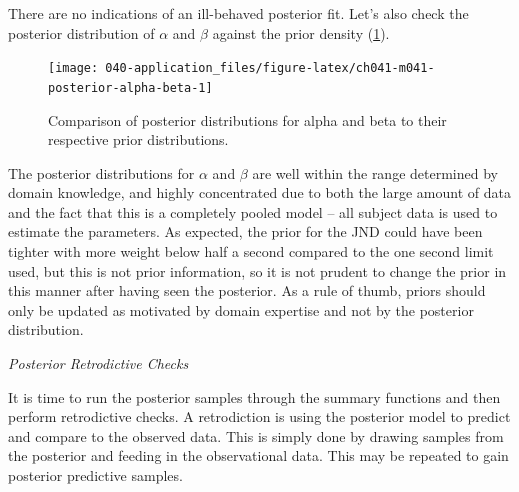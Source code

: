 \documentclass[11pt, oneside, openany]{scrbook}
\newenvironment{Shaded}{\begin{snugshade}}{\end{snugshade}}
\newcommand{\FloatTok}[1]{\textcolor[rgb]{0.00,0.00,0.81}{#1}}
\newcommand{\KeywordTok}[1]{\textcolor[rgb]{0.13,0.29,0.53}{\textbf{#1}}}
\newcommand{\NormalTok}[1]{#1}
\newcommand{\OperatorTok}[1]{\textcolor[rgb]{0.81,0.36,0.00}{\textbf{#1}}}
\newcommand{\StringTok}[1]{\textcolor[rgb]{0.31,0.60,0.02}{#1}}
\begin{document}
There are no indications of an ill-behaved posterior fit. Let's also check the posterior distribution of \(\alpha\) and \(\beta\) against the prior density (\ref{fig:ch041-m041-posterior-alpha-beta}).

\begin{figure}

{\centering \texttt{[image: 040-application\_files/figure-latex/ch041-m041-posterior-alpha-beta-1]} 

}

\caption{Comparison of posterior distributions for alpha and beta to their respective prior distributions.}\label{fig:ch041-m041-posterior-alpha-beta}
\end{figure}

The posterior distributions for \(\alpha\) and \(\beta\) are well within the range determined by domain knowledge, and highly concentrated due to both the large amount of data and the fact that this is a completely pooled model -- all subject data is used to estimate the parameters. As expected, the prior for the JND could have been tighter with more weight below half a second compared to the one second limit used, but this is not prior information, so it is not prudent to change the prior in this manner after having seen the posterior. As a rule of thumb, priors should only be updated as motivated by domain expertise and not by the posterior distribution.

\emph{Posterior Retrodictive Checks}

It is time to run the posterior samples through the summary functions and then perform retrodictive checks. A retrodiction is using the posterior model to predict and compare to the observed data. This is simply done by drawing samples from the posterior and feeding in the observational data. This may be repeated to gain posterior predictive samples.


\begin{Shaded}
\end{Shaded}
\end{document}
